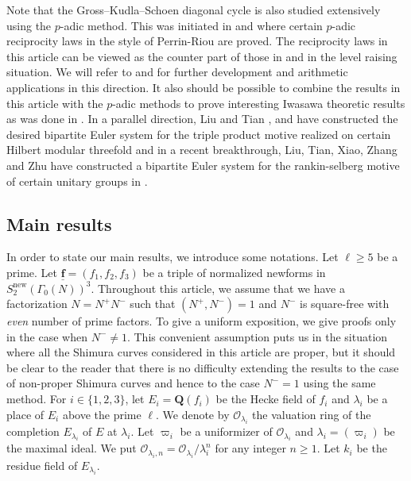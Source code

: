 \documentclass[10pt]{amsart}
\numberwithin{equation}{section}
\theoremstyle{plain}
\numberwithin{equation}{section}
\theoremstyle{definition}
\theoremstyle{remark}
\def\new{\mathrm{new}}
\def\triplef{\underline{\mathbf{f}}}
\def\calO{\mathcal{O}}
\def\QQ{\mathbf{Q}}
\begin{document}
Note that the Gross--Kudla--Schoen diagonal cycle is also studied extensively using the $p$-adic method. This was initiated in \cite{DR-1} and \cite{DR-2} where certain $p$-adic reciprocity laws in the style of Perrin-Riou are proved. The reciprocity laws in this article can be viewed as the counter part of those in \cite{DR-1}  and \cite{DR-2} in the level raising situation. We will refer to \cite{BDRSV} and \cite{Ca-H} for further development and arithmetic applications in this direction. It also should be possible to combine the results in this article with the $p$-adic methods to prove interesting Iwasawa theoretic results as was done in \cite{BD}. In a parallel direction, Liu and Tian \cite{Liu-HZ}, \cite{Liu-cubic} and \cite{LT} have constructed the desired bipartite Euler system for the triple product motive realized on certain Hilbert modular threefold and in a recent breakthrough, Liu, Tian, Xiao, Zhang and Zhu have constructed a bipartite Euler system for the rankin-selberg motive of certain unitary groups in \cite{LTX, LTXZZ}.

\subsection{Main results} In order to state our main results, we introduce some notations. Let $\ell\geq 5$ be a prime. Let $\triplef=(f_{1}, f_{2}, f_{3})$ be a triple of normalized newforms in $S^{\new}_{2}(\Gamma_{0}(N))^{3}$. Throughout this article, we assume that we have a factorization $N=N^{+}N^{-}$ such that $(N^{+}, N^{-})=1$ and $N^{-}$ is square-free with \emph{even} number of prime factors. To give a uniform exposition, we give proofs only in the case when $N^{-}\neq 1$. This convenient assumption puts us in the situation where all the Shimura curves considered in this article are proper, but it should be clear to the reader that there is no difficulty extending the results to the case of non-proper Shimura curves and hence to the case $N^{-}=1$ using the same method.  For $i\in\{1, 2, 3\}$, let $E_{i}=\QQ(f_{i})$ be the Hecke field of $f_{i}$ and $\lambda_{i}$ be a place of $E_{i}$ above the prime $\ell$. We denote by $\calO_{\lambda_{i}}$ the valuation ring of the completion $E_{\lambda_{i}}$ of $E$ at $\lambda_{i}$. Let $\varpi_{i}$ be a uniformizer of  $\calO_{\lambda_{i}}$ and $\lambda_{i}=(\varpi_{i})$ be the maximal ideal. We put $\calO_{\lambda_{i}, n}=\calO_{\lambda_{i}}/\lambda_{i}^{n}$ for any integer $n\geq 1$. Let $k_{i}$ be the residue field of $E_{\lambda_{i}}$. 
\end{document}

